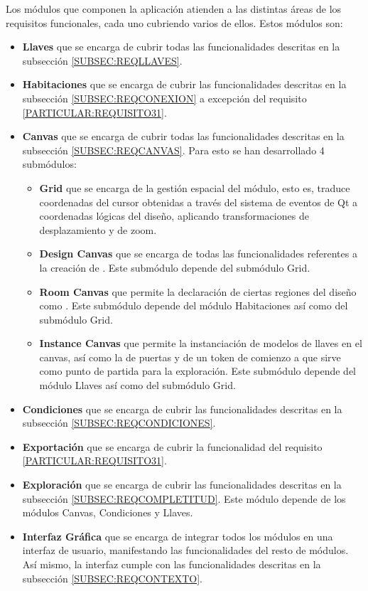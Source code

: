 Los módulos que componen la aplicación atienden a las distintas áreas de los requisitos funcionales, cada uno cubriendo varios de ellos. Estos módulos son:
\begin{itemize}
	\item \textbf{Llaves} que se encarga de cubrir todas las funcionalidades descritas en la subsección \ref{SUBSEC:REQLLAVES}.
	\item \textbf{Habitaciones} que se encarga de cubrir las funcionalidades descritas en la subsección \ref{SUBSEC:REQCONEXION} a excepción del requisito \ref{PARTICULAR:REQUISITO31}.
	\item \textbf{Canvas} que se encarga de cubrir todas las funcionalidades descritas en la subsección \ref{SUBSEC:REQCANVAS}. Para esto se han desarrollado 4 submódulos:
	\begin{itemize}
		\item \textbf{Grid} que se encarga de la gestión espacial del módulo, esto es, traduce coordenadas del cursor obtenidas a través del sistema de eventos de Qt a coordenadas lógicas del diseño, aplicando transformaciones de desplazamiento y de zoom.
		\item \textbf{Design Canvas} que se encarga de todas las funcionalidades referentes a la creación de . Este submódulo depende del submódulo Grid.
		\item \textbf{Room Canvas} que permite la declaración de ciertas regiones del diseño como . Este submódulo depende del módulo Habitaciones así como del submódulo Grid.
		\item \textbf{Instance Canvas} que permite la instanciación de modelos de llaves en el canvas, así como la de puertas y de un token de comienzo a que sirve como punto de partida para la exploración. Este submódulo depende del módulo Llaves así como del submódulo Grid.
	\end{itemize}
	\item \textbf{Condiciones} que se encarga de cubrir las funcionalidades descritas en la subsección \ref{SUBSEC:REQCONDICIONES}.
	\item \textbf{Exportación} que se encarga de cubrir la funcionalidad del requisito \ref{PARTICULAR:REQUISITO31}.
	\item \textbf{Exploración} que se encarga de cubrir las funcionalidades descritas en la subsección \ref{SUBSEC:REQCOMPLETITUD}. Este módulo depende de los módulos Canvas, Condiciones y Llaves.
	\item \textbf{Interfaz Gráfica} que se encarga de integrar todos los módulos en una interfaz de usuario, manifestando las funcionalidades del resto de módulos. Así mismo, la interfaz cumple con las funcionalidades descritas en la subsección \ref{SUBSEC:REQCONTEXTO}.
\end{itemize}

